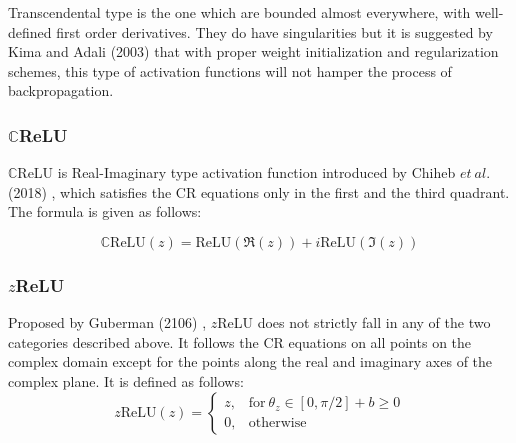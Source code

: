  Transcendental type is the one which are bounded almost everywhere, with well-defined first order derivatives. They do have singularities but it is suggested by Kima and Adali (2003) \cite{kim2003approximation} that with proper weight initialization and regularization schemes, this type of activation functions will not hamper the process of backpropagation.
 
 
 
 




\subsubsection{$\mathbb{C}$ReLU}
$\mathbb{C}$ReLU is Real-Imaginary type activation function introduced by Chiheb $et \ al.$ (2018) \cite{trabelsi2018deep}, which satisfies the CR equations only in the first and the third quadrant. The formula is given as follows:

\begin{equation}
\label{eqcrelu}
\mathbb{C}\mathrm{ReLU}(z) = \mathrm{ReLU}(\Re(z))+i\mathrm{ReLU}(\Im(z))
\end{equation}

 
 
 \subsubsection{$z$ReLU}
 Proposed by Guberman (2106) \cite{Guberman}, $z$ReLU does not strictly fall in any of the two categories described above. It follows the CR equations on all points on the complex domain except for the points along the real and imaginary axes of the complex plane. It is defined as follows:
  \begin{equation}
  \label{eqzrelu}
 z\mathrm{ReLU}(z) 
 {}=\begin{cases} z , &\mathrm{for} \ \theta_{z} \in [0,\pi/2] + b\ge 0 \\ 0 , &\textrm{otherwise} \end{cases}
 \end{equation}

